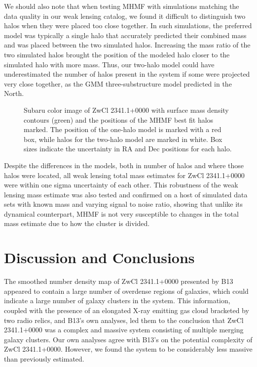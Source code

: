 \documentclass[onecolumn]{aastex}
\begin{document}
We should also note that when testing MHMF with simulations matching the data quality in our weak lensing catalog, we found it difficult to distinguish two halos when they were placed too close together.  In such simulations, the preferred model was typically a single halo that accurately predicted their combined mass and was placed between the two simulated halos.  Increasing the mass ratio of the two simulated halos brought the position of the modeled halo closer to the simulated halo with more mass.  Thus, our two-halo model could have underestimated the number of halos present in the system if some were projected very close together, as the GMM three-substructure model predicted in the North.

\begin{figure}
\caption{Subaru color image of ZwCl 2341.1+0000 with surface mass density contours (green) and the positions of the MHMF best fit halos marked.  The position of the one-halo model is marked with a red box, while halos for the two-halo model are marked in white.  Box sizes indicate the uncertainty in RA and Dec positions for each halo.\label{fig14}} 
\end{figure}

Despite the differences in the models, both in number of halos and where those halos were located, all weak lensing total mass estimates for ZwCl 2341.1+0000 were within one sigma uncertainty of each other.  This robustness of the weak lensing mass estimate was also tested and confirmed on a host of simulated data sets with known mass and varying signal to noise ratio, showing that unlike its dynamical counterpart, MHMF is not very susceptible to changes in the total mass estimate due to how the cluster is divided.  

\section{Discussion and Conclusions}
The smoothed number density map of ZwCl 2341.1+0000 presented by B13 appeared to contain a large number of overdense regions of galaxies, which could indicate a large number of galaxy clusters in the system.  This information, coupled with the presence of an elongated X-ray emitting gas cloud bracketed by two radio relics, and B13's own analyses, led them to the conclusion that ZwCl 2341.1+0000 was a complex and massive system consisting of multiple merging galaxy clusters.  Our own analyses agree with B13's on the potential complexity of ZwCl 2341.1+0000.  However, we found the system to be considerably less massive than previously estimated.
\end{document}
